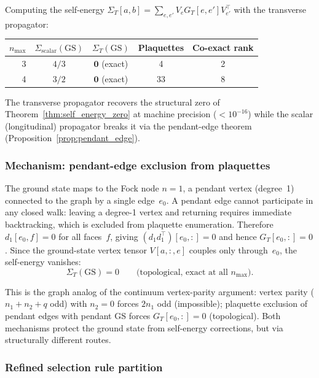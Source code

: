 \documentclass[11pt]{article}
\begin{document}
Computing the self-energy $\Sigma_T[a,b] = \sum_{e,e'} V_e G_T[e,e'] V_{e'}^\top$
with the transverse propagator:
\begin{center}
\begin{tabular}{rcccc}
\hline
$n_{\max}$ & $\Sigma_{\mathrm{scalar}}(\mathrm{GS})$ & $\Sigma_T(\mathrm{GS})$ & Plaquettes & Co-exact rank \\
\hline
3 & $4/3$ & $\mathbf{0}$ (exact) & 4 & 2 \\
4 & $3/2$ & $\mathbf{0}$ (exact) & 33 & 8 \\
\hline
\end{tabular}
\end{center}
The transverse propagator recovers the structural zero of
Theorem~\ref{thm:self_energy_zero} at machine precision ($< 10^{-16}$)
while the scalar (longitudinal) propagator breaks it via the pendant-edge
theorem (Proposition~\ref{prop:pendant_edge}).

\subsubsection{Mechanism: pendant-edge exclusion from plaquettes}

The ground state maps to the Fock node $n = 1$, a pendant vertex
(degree~1) connected to the graph by a single edge~$e_0$.  A pendant
edge cannot participate in any closed walk: leaving a degree-1 vertex
and returning requires immediate backtracking, which is excluded from
plaquette enumeration.  Therefore $d_1[e_0, f] = 0$ for all faces~$f$,
giving $(d_1 d_1^\top)[e_0, :] = 0$ and hence $G_T[e_0, :] = 0$.
Since the ground-state vertex tensor $V[a, :, e]$ couples only
through~$e_0$, the self-energy vanishes:
\begin{equation}
  \Sigma_T(\mathrm{GS}) = 0 \qquad \text{(topological, exact at all $n_{\max}$)}.
\end{equation}

This is the graph analog of the continuum vertex-parity argument:
vertex parity ($n_1 + n_2 + q$ odd) with $n_2 = 0$ forces $2n_1$ odd
(impossible); plaquette exclusion of pendant edges with pendant GS
forces $G_T[e_0, :] = 0$ (topological).  Both mechanisms protect the
ground state from self-energy corrections, but via structurally
different routes.

\subsubsection{Refined selection rule partition}
\end{document}
